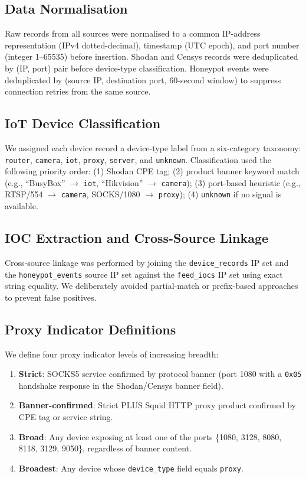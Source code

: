 \documentclass[journal]{IEEEtran}
\begin{document}
\subsection{Data Normalisation}

Raw records from all sources were normalised to a common IP-address
representation (IPv4 dotted-decimal), timestamp (UTC epoch), and
port number (integer 1--65535) before insertion.
Shodan and Censys records were deduplicated by (IP, port) pair before
device-type classification. Honeypot events were deduplicated by
(source IP, destination port, 60-second window) to suppress connection
retries from the same source.

\subsection{IoT Device Classification}

We assigned each device record a device-type label from a six-category
taxonomy:
\texttt{router}, \texttt{camera}, \texttt{iot}, \texttt{proxy},
\texttt{server}, and \texttt{unknown}.
Classification used the following priority order:
(1) Shodan CPE tag;
(2) product banner keyword match (e.g., ``BusyBox'' $\to$ \texttt{iot},
``Hikvision'' $\to$ \texttt{camera});
(3) port-based heuristic (e.g., RTSP/554 $\to$ \texttt{camera},
SOCKS/1080 $\to$ \texttt{proxy});
(4) \texttt{unknown} if no signal is available.

\subsection{IOC Extraction and Cross-Source Linkage}

Cross-source linkage was performed by joining the
\texttt{device\_records} IP set and the \texttt{honeypot\_events}
source IP set against the \texttt{feed\_iocs} IP set using exact string
equality.
We deliberately avoided partial-match or prefix-based approaches to
prevent false positives.

\subsection{Proxy Indicator Definitions}

We define four proxy indicator levels of increasing breadth:
\begin{enumerate}
  \item \textbf{Strict}: SOCKS5 service confirmed by protocol banner
    (port 1080 with a \texttt{0x05} handshake response in the
    Shodan/Censys banner field).
  \item \textbf{Banner-confirmed}: Strict PLUS Squid HTTP proxy
    product confirmed by CPE tag or service string.
  \item \textbf{Broad}: Any device exposing at least one of the ports
    \{1080, 3128, 8080, 8118, 3129, 9050\}, regardless of banner content.
  \item \textbf{Broadest}: Any device whose
    \texttt{device\_type} field equals \texttt{proxy}.
\end{enumerate}
\end{document}
